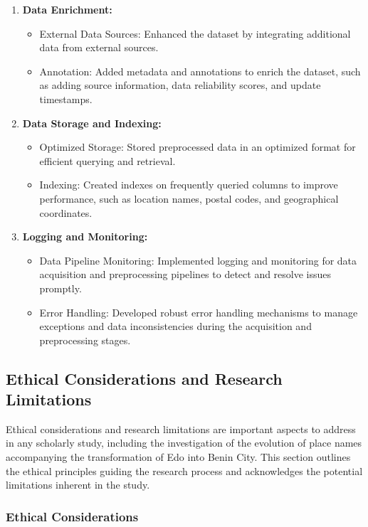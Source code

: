 \begin{enumerate}
    \item \textbf{Data Enrichment:}
    \begin{itemize}
        \item External Data Sources: Enhanced the dataset by integrating additional data from external sources.
        \item Annotation: Added metadata and annotations to enrich the dataset, such as adding source information, data reliability scores, and update timestamps.
    \end{itemize}
    
    \item \textbf{Data Storage and Indexing:}
    \begin{itemize}
        \item Optimized Storage: Stored preprocessed data in an optimized format for efficient querying and retrieval.
        \item Indexing: Created indexes on frequently queried columns to improve performance, such as location names, postal codes, and geographical coordinates.
    \end{itemize}
    
    \item \textbf{Logging and Monitoring:}
    \begin{itemize}
        \item Data Pipeline Monitoring: Implemented logging and monitoring for data acquisition and preprocessing pipelines to detect and resolve issues promptly.
        \item Error Handling: Developed robust error handling mechanisms to manage exceptions and data inconsistencies during the acquisition and preprocessing stages.
    \end{itemize}
\end{enumerate}

\subsection{Ethical Considerations and Research Limitations}

Ethical considerations and research limitations are important aspects to address in any scholarly study, including the investigation of the evolution of place names accompanying the transformation of Edo into Benin City. This section outlines the ethical principles guiding the research process and acknowledges the potential limitations inherent in the study.

\subsubsection{Ethical Considerations}

